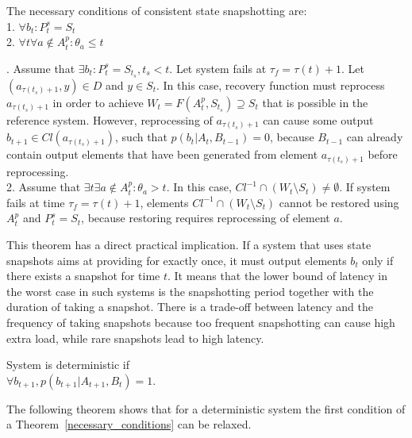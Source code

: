 \begin{theorem}
\label{necessary_conditions}
The necessary conditions of consistent state snapshotting are:\\
1. $\forall{b_t}:P^{s}_t=S_t$\\
2. $\forall{t}\forall{a}\notin{A^{p}_t} : \theta_a \leq t$
\end{theorem}
\begin{sketch}
$ $. Assume that $\exists{b_t}:P^{s}_t = S_{t_s}, t_s < t$. Let system fails at $\tau_f = \tau(t)+1$. Let $(a_{\tau(t_s)+1},y)\in{D}$ and $y\in{S_t}$. In this case, recovery function must reprocess $a_{\tau(t_s)+1}$ in order to achieve $W_t=F(A^{p}_t,S_{t_s})\supseteq{S_t}$ that is possible in the reference system. However, reprocessing of $a_{\tau(t_s)+1}$ can cause some output $ b_{t+1}\in{Cl(a_{\tau(t_s)+1})}$, such that $p(b_{t}|A_t,B_{t-1})=0$, because $B_{t-1}$ can already contain output elements that have been generated from element $a_{\tau(t_s)+1}$ before reprocessing. \\
2. Assume that $\exists{t} \exists{a} \notin{A^{p}_t}:\theta_{a}>t$. In this case, $Cl^{-1} \cap (W_t \setminus{S_t}) \neq \emptyset$. If system fails at time $\tau_f=\tau(t)+1$, elements $Cl^{-1} \cap (W_t \setminus{S_t})$ cannot be restored using $A^{p}_t$ and $P^{s}_t=S_t$, because restoring requires reprocessing of element $a$.
\end{sketch}

This theorem has a direct practical implication. If a system that uses state snapshots aims at providing for exactly once, it must output elements $b_t$ only if there exists a snapshot for time $t$. It means that the lower bound of latency in the worst case in such systems is the snapshotting period together with the duration of taking a snapshot. There is a trade-off between latency and the frequency of taking snapshots because too frequent snapshotting can cause high extra load, while rare snapshots lead to high latency.

\begin{definition}{System is deterministic}
if\\ 
$\forall{b_{t+1}},p(b_{t+1}|A_{t+1},B_t)=1$.
\end{definition}

The following theorem shows that for a deterministic system the first condition of a Theorem~\ref{necessary_conditions} can be relaxed. 

